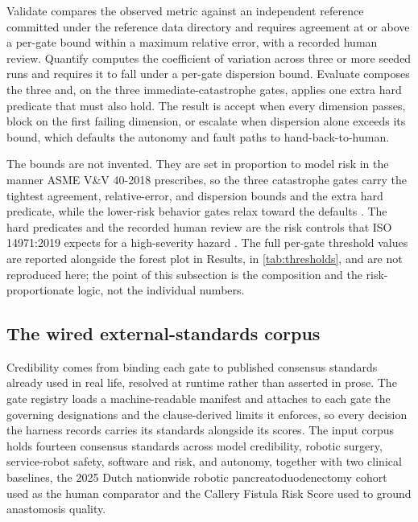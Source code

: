 Validate compares the observed metric against an independent reference
committed under the reference data directory and requires agreement at or above a
per-gate bound within a maximum relative error, with a recorded human review.
Quantify computes the coefficient of variation across three or more seeded runs
and requires it to fall under a per-gate dispersion bound. Evaluate composes the
three and, on the three immediate-catastrophe gates, applies one extra hard
predicate that must also hold. The result is accept when every dimension passes,
block on the first failing dimension, or escalate when dispersion alone exceeds
its bound, which defaults the autonomy and fault paths to hand-back-to-human.

The bounds are not invented. They are set in proportion to model risk in the
manner ASME V\&V 40-2018 prescribes, so the three catastrophe gates carry the
tightest agreement, relative-error, and dispersion bounds and the extra hard
predicate, while the lower-risk behavior gates relax toward the defaults
\cite{asmevv40}. The hard predicates and the recorded human review are the risk
controls that ISO 14971:2019 expects for a high-severity hazard \cite{iso14971}.
The full per-gate threshold values are reported alongside the forest plot in
Results, in \autoref{tab:thresholds}, and are not reproduced here; the
point of this subsection is the composition and the risk-proportionate logic, not
the individual numbers.

\subsection{The wired external-standards corpus}

Credibility comes from binding each gate to published consensus standards already
used in real life, resolved at runtime rather than asserted in prose. The gate
registry loads a machine-readable manifest and attaches to each gate the
governing designations and the clause-derived limits it enforces, so every
decision the harness records carries its standards alongside its scores. The
input corpus holds fourteen consensus standards across model credibility,
robotic surgery, service-robot safety, software and risk, and autonomy, together
with two clinical baselines, the 2025 Dutch nationwide robotic
pancreatoduodenectomy cohort used as the human comparator and the Callery Fistula
Risk Score used to ground anastomosis quality. 

